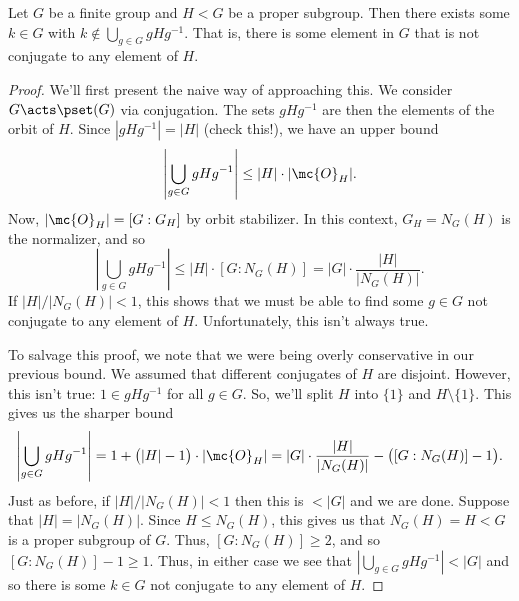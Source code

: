 \documentclass{article}
\begin{document}
\begin{prop*} Let $G$ be a finite group and $H<G$ be a proper subgroup. Then there exists some $k\in G$ with $k\not\in\bigcup_{g\in G}gHg^{-1}$. That is, there is some element in $G$ that is not conjugate to any element of $H$.\end{prop*}
\begin{proof} We'll first present the naive way of approaching this. We consider $G\acts\pset(G)$ via conjugation. The sets $gHg^{-1}$ are then the elements of the orbit of $H$. Since $|gHg^{-1}|=|H|$ (check this!), we have an upper bound
$$\left|\bigcup_{g\in G}gHg^{-1}\right|\leq |H|\cdot|\mc{O}_H|.$$
Now, $|\mc{O}_H|=[G:G_H]$ by orbit stabilizer. In this context, $G_H=N_G(H)$ is the normalizer, and so
$$\left|\bigcup_{g\in G}gHg^{-1}\right|\leq |H|\cdot[G:N_G(H)]=|G|\cdot\frac{|H|}{|N_G(H)|}.$$
If $|H|/|N_G(H)|<1$, this shows that we must be able to find some $g\in G$ not conjugate to any element of $H$. Unfortunately, this isn't always true.

To salvage this proof, we note that we were being overly conservative in our previous bound. We assumed that different conjugates of $H$ are disjoint. However, this isn't true: $1\in gHg^{-1}$ for all $g\in G$. So, we'll split $H$ into $\{1\}$ and $H\setminus\{1\}$. This gives us the sharper bound
$$\left|\bigcup_{g\in G}gHg^{-1}\right|=1+\big(|H|-1\big)\cdot|\mc{O}_H|=|G|\cdot\frac{|H|}{|N_G(H)|}-\big([G:N_G(H)]-1\big).$$
Just as before, if $|H|/|N_G(H)|<1$ then this is $<|G|$ and we are done. Suppose that $|H|=|N_G(H)|$. Since $H\leq N_G(H)$, this gives us that $N_G(H)=H<G$ is a proper subgroup of $G$. Thus, $[G:N_G(H)]\geq 2$, and so $[G:N_G(H)]-1\geq 1$. Thus, in either case we see that $\left|\bigcup_{g\in G}gHg^{-1}\right|<|G|$ and so there is some $k\in G$ not conjugate to any element of $H$. \end{proof}
\end{document}
